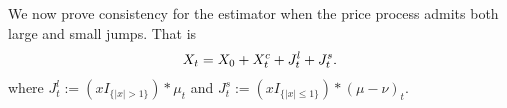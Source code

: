 \begin{comment} \subsection{Infinite activity \levy jumps}
We now turn to the case of a price process specified in full generality by \eqref{eq:generalsemimartingale}, that is the price process is a sum of a continuous and a discontinuous process with possibly  infinite activity. The infinite activity assumption is equivalent to  the statement that $\nu$ assigns  infinite measure to the complement of the singleton containing zero.    The following is the consistency Proposition in this more general framework:
\end{comment}
We now prove consistency for the estimator when the price process admits both large and small jumps. That is 
\begin{align}
  X_t = X_0 + X^c_t + J^l_t + J^s_t. \notag
  \label{}
\end{align}
where $J^l_t := (xI_{\{\vert x \vert > 1\}}) \ast \mu_t$ and  $J^s_t := (xI_{\{\vert x \vert \le 1\}}) \ast (\mu - \nu)_t$.
